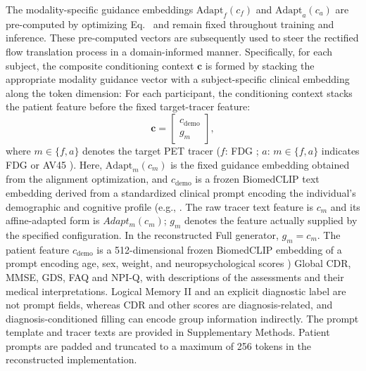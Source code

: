 \documentclass{article}
\providecommand{\DIFaddtex}[1]{{\protect\color{blue} \sf #1}} %
\providecommand{\DIFdeltex}[1]{{\protect\color{red} \scriptsize #1}} %
\providecommand{\DIFaddbegin}{} %
\providecommand{\DIFaddend}{} %
\providecommand{\DIFdelbegin}{} %
\providecommand{\DIFdelend}{} %
\providecommand{\DIFadd}[1]{\texorpdfstring{\DIFaddtex{#1}}{#1}} %
\providecommand{\DIFdel}[1]{\texorpdfstring{\DIFdeltex{#1}}{}} %
\newcommand{\DIFscaledelfig}{0.5}
\newlength{\DIFdelgraphicswidth} %
\newlength{\DIFdelgraphicsheight} %
\newcommand{\DIFaddincludegraphics}[2][]{{\color{blue}\fbox{\DIFOincludegraphics[#1]{#2}}}} %
\newcommand{\DIFdelincludegraphics}[2][]{%
\sbox{\DIFdelgraphicsbox}{\DIFOincludegraphics[#1]{#2}}%
\settoboxwidth{\DIFdelgraphicswidth}{\DIFdelgraphicsbox} %
\settoboxtotalheight{\DIFdelgraphicsheight}{\DIFdelgraphicsbox} %
\scalebox{\DIFscaledelfig}{%
\parbox[b]{\DIFdelgraphicswidth}{\usebox{\DIFdelgraphicsbox}\\[-\baselineskip] \rule{\DIFdelgraphicswidth}{0em}}\llap{\resizebox{\DIFdelgraphicswidth}{\DIFdelgraphicsheight}{%
\setlength{\unitlength}{\DIFdelgraphicswidth}%
\begin{picture}(1,1)%
\thicklines\linethickness{2pt} %
{\color[rgb]{1,0,0}\put(0,0){\framebox(1,1){}}}%
{\color[rgb]{1,0,0}\put(0,0){\line( 1,1){1}}}%
{\color[rgb]{1,0,0}\put(0,1){\line(1,-1){1}}}%
\end{picture}%
}\hspace*{3pt}}} %
} %
\DeclareRobustCommand{\DIFaddbegin}{\DIFOaddbegin \let\includegraphics\DIFaddincludegraphics} %
\DeclareRobustCommand{\DIFaddend}{\DIFOaddend \let\includegraphics\DIFOincludegraphics} %
\DeclareRobustCommand{\DIFdelbegin}{\DIFOdelbegin \let\includegraphics\DIFdelincludegraphics} %
\DeclareRobustCommand{\DIFdelend}{\DIFOaddend \let\includegraphics\DIFOincludegraphics} %
\begin{document}
\DIFdelbegin \DIFdel{The modality-specific guidance embeddings $\text{Adapt}_f(c_f)$ and $\text{Adapt}_a(c_a)$ are pre-computed by optimizing Eq.~}%
\DIFdel{and remain fixed throughout training and inference. These pre-computed vectors are subsequently used to steer the rectified flow translation process in a domain-informed manner. Specifically, for each subject, the composite conditioning context $\mathbf{c} $ is formed by stacking the appropriate modality guidance vector with a subject-specific clinical embedding along the token dimension:
}\DIFdelend \DIFaddbegin \DIFadd{For each participant, the conditioning context stacks the patient feature before the fixed target-tracer feature:
}\DIFaddend \begin{equation}
\mathbf{c}=\DIFdelbegin %
\DIFdelend \DIFaddbegin \begin{bmatrix}c_{\mathrm{demo}}\\g_m\end{bmatrix}\DIFaddend ,
\label{eq:composite_conditioning}
\end{equation}
where \DIFdelbegin \DIFdel{$m \in \{f, a\}$ denotes the target PET tracer ($f$: FDG ; $a$: }\DIFdelend \DIFaddbegin \DIFadd{$m\in\{f,a\}$ indicates FDG or }\DIFaddend AV45\DIFdelbegin \DIFdel{). Here, $\text{Adapt}_m(c_m)$ is the fixed guidance embedding obtained from the alignment optimization, and $c_{\text{demo}} $ is a frozen BiomedCLIP text embedding derived from a standardized clinical prompt encoding the individual’s demographic and cognitive profile (e.g., }\DIFdelend \DIFaddbegin \DIFadd{. The raw tracer text feature is $c_m$ and its affine-adapted form is $Adapt_m(c_m)$; $g_m$ denotes the feature actually supplied by the specified configuration. In the reconstructed Full generator, $g_m=c_m$. The patient feature $c_{\mathrm{demo}}$ is a 512-dimensional frozen BiomedCLIP embedding of a prompt encoding }\DIFaddend age, sex, weight, \DIFdelbegin \DIFdel{and neuropsychological scores )}\DIFdelend \DIFaddbegin \DIFadd{Global CDR, MMSE, GDS, FAQ and NPI-Q, with descriptions of the assessments and their medical interpretations. Logical Memory II and an explicit diagnostic label are not prompt fields, whereas CDR and other scores are diagnosis-related, and diagnosis-conditioned filling can encode group information indirectly. The prompt template and tracer texts are provided in Supplementary Methods. Patient prompts are padded and truncated to a maximum of 256 tokens in the reconstructed implementation}\DIFaddend .
\end{document}
